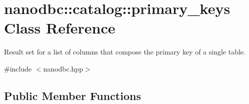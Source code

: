 \hypertarget{classnanodbc_1_1catalog_1_1primary__keys}{}\section{nanodbc\+::catalog\+::primary\+\_\+keys Class Reference}
\label{classnanodbc_1_1catalog_1_1primary__keys}


Result set for a list of columns that compose the primary key of a single table.  




{\ttfamily \#include $<$nanodbc.\+hpp$>$}

\subsection*{Public Member Functions}
